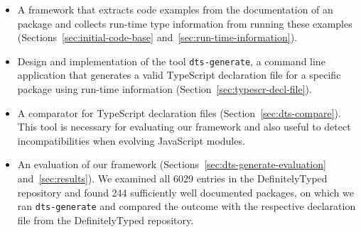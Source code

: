 \documentclass[english,cleveref,autoref,submission]{programming}
\begin{document}
\begin{itemize}
\item A framework that extracts code examples from the
  documentation of an \NPM{} package and collects run-time type
  information from running these examples (Sections~\ref{sec:initial-code-base}
  and~\ref{sec:run-time-information}). 

\item Design and implementation of the tool \texttt{dts-generate}, a command line
  application that generates a valid TypeScript declaration file for a
  specific \NPM{} package using run-time information (Section~\ref{sec:typescr-decl-file}).

\item A comparator for TypeScript declaration files (Section~\ref{sec:dts-compare}). This tool is
  necessary for evaluating our framework and also useful to detect
  incompatibilities when evolving JavaScript modules.
\item An evaluation of our framework (Sections~\ref{sec:dts-generate-evaluation}
  and~\ref{sec:results}). We examined all 6029 entries in 
  the DefinitelyTyped repository and found 244 sufficiently
  well documented \NPM{} packages, on which we ran \texttt{dts-generate}
  and compared the outcome with the respective declaration file from the
  DefinitelyTyped repository. 
\end{itemize}
\end{document}

